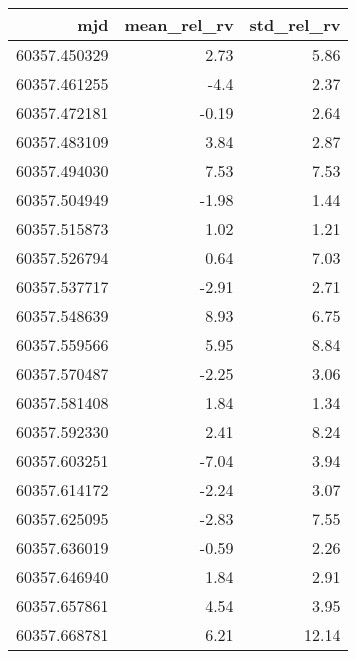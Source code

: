\begin{tabular}{rrr}
\toprule
mjd & mean_rel_rv & std_rel_rv \\
\midrule
60357.450329 & 2.73 & 5.86 \\
60357.461255 & -4.4 & 2.37 \\
60357.472181 & -0.19 & 2.64 \\
60357.483109 & 3.84 & 2.87 \\
60357.494030 & 7.53 & 7.53 \\
60357.504949 & -1.98 & 1.44 \\
60357.515873 & 1.02 & 1.21 \\
60357.526794 & 0.64 & 7.03 \\
60357.537717 & -2.91 & 2.71 \\
60357.548639 & 8.93 & 6.75 \\
60357.559566 & 5.95 & 8.84 \\
60357.570487 & -2.25 & 3.06 \\
60357.581408 & 1.84 & 1.34 \\
60357.592330 & 2.41 & 8.24 \\
60357.603251 & -7.04 & 3.94 \\
60357.614172 & -2.24 & 3.07 \\
60357.625095 & -2.83 & 7.55 \\
60357.636019 & -0.59 & 2.26 \\
60357.646940 & 1.84 & 2.91 \\
60357.657861 & 4.54 & 3.95 \\
60357.668781 & 6.21 & 12.14 \\
\bottomrule
\end{tabular}
